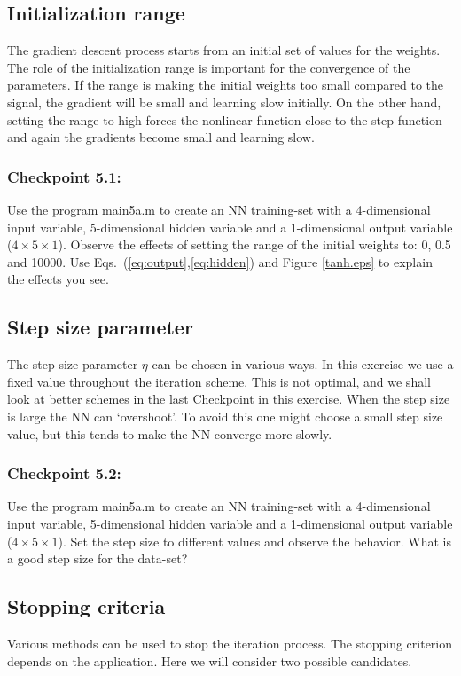 \documentclass[12pt]{article}
\begin{document}
\subsection*{Initialization range}
The gradient descent process starts from  an initial set of values for the weights.
 The role of the
initialization range is important for the convergence of
the parameters. If the range is making the initial weights too
small compared to the signal, the gradient will be small and learning slow initially. On the other hand, setting the
range to high forces the nonlinear function close to the step
function and again the gradients become small and learning slow.


\subsubsection*{Checkpoint 5.1:}
Use the program {\sf main5a.m} to create an NN training-set with a
4-dimensional input variable, 5-dimensional hidden variable and a
1-dimensional output variable ($4\times 5\times 1$). Observe the
effects of setting the range of the initial weights to: 0, 0.5 and
10000. Use Eqs.\ (\ref{eq:output},\ref{eq:hidden}) and Figure \ref{tanh.eps} to explain the effects you see.


\subsection*{Step size parameter}
 The step
size parameter $\eta$ can be chosen in various ways. In this exercise we use a
 fixed value throughout the iteration scheme. This is not optimal, and we shall look
 at better schemes in the last Checkpoint in this exercise. When the step size is large the NN can `overshoot'.
 To avoid this one might choose a small step size
value, but this tends to make the NN converge more slowly.

\subsubsection*{Checkpoint 5.2:}
Use the program {\sf main5a.m} to create an NN training-set with a
4-dimensional input variable, 5-dimensional hidden variable and a
1-dimensional output variable ($4\times 5\times 1$). Set the step size to different
values and observe the behavior. What is a good step size
for the data-set?


\subsection*{Stopping criteria}
Various methods can be used to stop the iteration process. The stopping criterion
depends on the application. Here we will consider two possible candidates.
\end{document}
